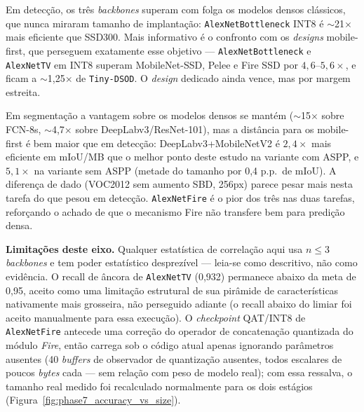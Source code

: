 \documentclass[conference]{IEEEtran}
\begin{document}
Em detecção, os três \textit{backbones} superam com folga os modelos densos clássicos, que nunca
miraram tamanho de implantação: \texttt{AlexNetBottleneck} INT8 é $\sim$21$\times$ mais eficiente
que SSD300. Mais informativo é o confronto com os \textit{designs} mobile-first, que perseguem
exatamente esse objetivo — \texttt{AlexNetBottleneck} e \texttt{AlexNetTV} em INT8 superam
MobileNet-SSD, Pelee e Fire SSD por $4,6$--$5,6\times$, e ficam a $\sim$1,25$\times$ de
\texttt{Tiny-DSOD}. O \textit{design} dedicado ainda vence, mas por margem estreita.

Em segmentação a vantagem sobre os modelos densos se mantém ($\sim$15$\times$ sobre FCN-8s,
$\sim$4,7$\times$ sobre DeepLabv3/ResNet-101), mas a distância para os mobile-first é bem maior que
em detecção: DeepLabv3+MobileNetV2 é $2,4\times$ mais eficiente em mIoU/MB que o melhor ponto deste
estudo na variante com ASPP, e $5,1\times$ na variante sem ASPP (metade do tamanho por 0,4 p.p.\ de
mIoU). A diferença de dado (VOC2012 sem aumento SBD, 256px) parece pesar mais nesta
tarefa do que pesou em detecção. \texttt{AlexNetFire} é o pior dos três nas duas tarefas,
reforçando o achado de que o mecanismo Fire não transfere bem para predição densa.

\textbf{Limitações deste eixo.} Qualquer estatística de correlação aqui usa $n\leq3$
\textit{backbones} e tem poder estatístico desprezível — leia-se como descritivo, não como
evidência. O recall de âncora de \texttt{AlexNetTV} (0,932) permanece abaixo da meta de 0,95,
aceito como uma limitação estrutural de sua pirâmide de características nativamente mais grosseira,
não perseguido adiante (o recall abaixo do limiar foi aceito manualmente para essa execução). O
\textit{checkpoint} QAT/INT8 de \texttt{AlexNetFire} antecede uma correção do operador de
concatenação quantizada do módulo \textit{Fire}, então carrega sob o código atual apenas ignorando
parâmetros ausentes (40 \textit{buffers} de observador de quantização ausentes, todos escalares de
poucos \textit{bytes} cada — sem relação com peso de modelo real); com essa ressalva, o tamanho
real medido foi recalculado normalmente para os dois estágios
(Figura~\ref{fig:phase7_accuracy_vs_size}).
\end{document}

